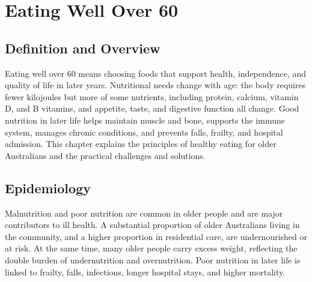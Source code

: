 \chapter{Eating Well Over 60}

\section*{Definition and Overview}
Eating well over 60 means choosing foods that support health, independence, and quality of life in later years. Nutritional needs change with age: the body requires fewer kilojoules but more of some nutrients, including protein, calcium, vitamin D, and B vitamins, and appetite, taste, and digestive function all change. Good nutrition in later life helps maintain muscle and bone, supports the immune system, manages chronic conditions, and prevents falls, frailty, and hospital admission. This chapter explains the principles of healthy eating for older Australians and the practical challenges and solutions.

\section*{Epidemiology}
Malnutrition and poor nutrition are common in older people and are major contributors to ill health. A substantial proportion of older Australians living in the community, and a higher proportion in residential care, are undernourished or at risk. At the same time, many older people carry excess weight, reflecting the double burden of undernutrition and overnutrition. Poor nutrition in later life is linked to frailty, falls, infections, longer hospital stays, and higher mortality.

